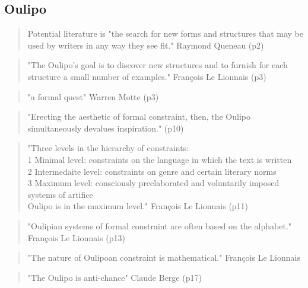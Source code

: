 \subsection{Oulipo}


\begin{quote}
  Potential literature is "the search for new forms and structures that may be used by writers in any way they see fit." Raymond Queneau (p2)
\end{quote}

\begin{quote}
  "The Oulipo's goal is to discover new structures and to furnish for each structure a small number of examples." François Le Lionnais (p3)
\end{quote}

\begin{quote}
  "a formal quest" Warren Motte (p3)
\end{quote}

\begin{quote}
  "Erecting the aesthetic of formal constraint, then, the Oulipo simultaneously devalues inspiration." (p10)
\end{quote}

\begin{quote}
  "Three levels in the hierarchy of constraints:\\1 Minimal level: constraints on the language in which the text is written\\2 Intermedaite level: constraints on genre and certain literary norms\\3 Maximum level: consciously preelaborated and voluntarily imposed systems of artifice\\Oulipo is in the maximum level." François Le Lionnais (p11)
\end{quote}

\begin{quote}
  "Oulipian systems of formal constraint are often based on the alphabet."  François Le Lionnais (p13)
\end{quote}

\begin{quote}
  "The nature of Oulipoan constraint is mathematical." François Le Lionnais
\end{quote}

\begin{quote}
  "The Oulipo is anti-chance" Claude Berge (p17)
\end{quote}

